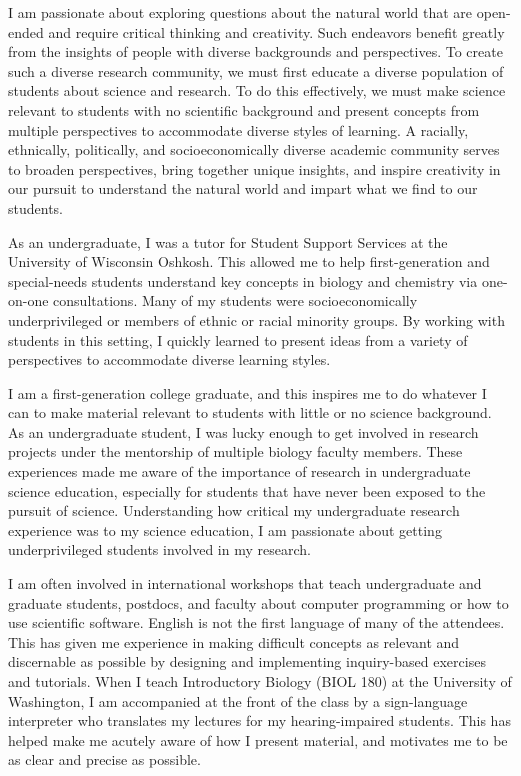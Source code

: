 I am passionate about exploring questions about the natural world that are
open-ended and require critical thinking and creativity.
Such endeavors benefit greatly from the insights of people with diverse
backgrounds and perspectives.
To create such a diverse research community, we must first educate a diverse
population of students about science and research.
To do this effectively, we must make science relevant to students with no
scientific background and present concepts from multiple perspectives to
accommodate diverse styles of learning.
A racially, ethnically, politically, and socioeconomically diverse academic
community serves to broaden perspectives, bring together unique insights, and
inspire creativity in our pursuit to understand the natural world and impart
what we find to our students.

As an undergraduate, I was a tutor for Student Support Services at the
University of Wisconsin Oshkosh.
This allowed me to help first-generation and special-needs students understand
key concepts in biology and chemistry via one-on-one consultations.
Many of my students were socioeconomically underprivileged or members of ethnic
or racial minority groups.
By working with students in this setting, I quickly learned to
present ideas from a variety of perspectives to accommodate diverse learning
styles.

I am a first-generation college graduate, and
this inspires me to do whatever I can to make material relevant to students
with little or no science background.
As an undergraduate student, I was lucky enough to get involved in research
projects under the mentorship of multiple biology faculty members.
These experiences made me aware of the importance of research in undergraduate
science education, especially for students that have never been exposed to the
pursuit of science.
Understanding how critical my undergraduate research experience was to my
science education, I am passionate about getting underprivileged students
involved in my research.

I am often involved in international workshops that teach undergraduate and
graduate students, postdocs, and faculty about computer programming or how to
use scientific software.
English is not the first language of many of the attendees.
This has given me experience in making difficult concepts as relevant and
discernable as possible by designing and implementing inquiry-based exercises
and tutorials.
When I teach Introductory Biology (BIOL 180) at the University of Washington, I
am accompanied at the front of the class by a sign-language interpreter who
translates my lectures for my hearing-impaired students.
This has helped make me acutely aware of how I present material, and motivates
me to be as clear and precise as possible.


